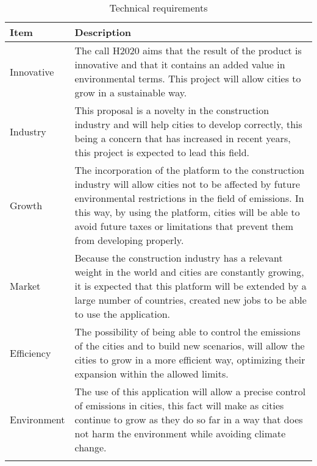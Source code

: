 \begin{longtable}[H]{l p{12cm}}
		
		\toprule[2pt]
		
		\textbf{Item} &  \textbf{Description}\\
		
		\midrule [1.5pt]
		
		Innovative & The call H2020 aims that the result of the product is innovative and that it contains an added value in environmental terms. This project will allow cities to grow in a sustainable way.\vspace{0.2cm}\\
		
		\midrule
		
		Industry & This proposal is a novelty in the construction industry and will help cities to develop correctly, this being a concern that has increased in recent years, this project is expected to lead this field.\vspace{0.2cm}\\
		
		\midrule
		
		Growth & The incorporation of the platform to the construction industry will allow cities not to be affected by future environmental restrictions in the field of emissions. In this way, by using the platform, cities will be able to avoid future taxes or limitations that prevent them from developing properly.\vspace{0.2cm}\\
		
		\midrule
		
		Market & Because the construction industry has a relevant weight in the world and cities are constantly growing, it is expected that this platform will be extended by a large number of countries, created new jobs to be able to use the application.\vspace{0.2cm}\\
		
		\midrule
		
		Efficiency & The possibility of being able to control the emissions of the cities and to build new scenarios, will allow the cities to grow in a more efficient way, optimizing their expansion within the allowed limits.\vspace{0.2cm}\\
		
		\midrule
		
		Environment & The use of this application will allow a precise control of emissions in cities, this fact will make as cities continue to grow as they do so far in a way that does not harm the environment while avoiding climate change.\vspace{0.2cm}\\
		
		
		\bottomrule[2pt]
	\caption{Technical requirements}
\end{longtable}

